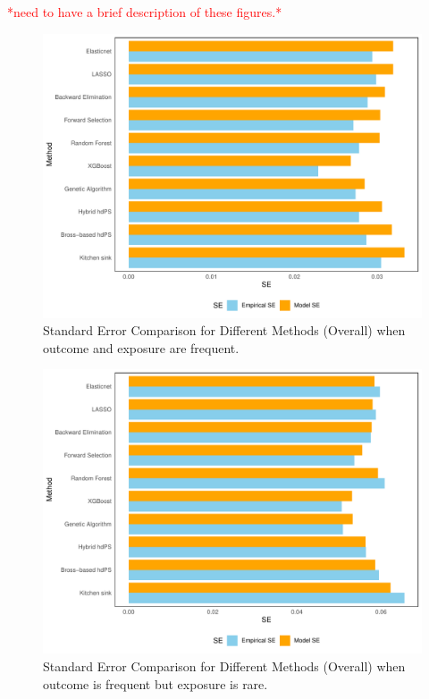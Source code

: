 \documentclass[
  10pt,
]{article}
\begin{document}
\textcolor{red}{*need to have a brief description of these figures.*}

\begin{figure}

{\centering \includegraphics[width=1\linewidth]{se_comparison_plot} 

}

\caption{Standard Error Comparison for Different Methods (Overall) when outcome and exposure are frequent.}\label{fig:unnamed-chunk-1}
\end{figure}

\begin{figure}

{\centering \includegraphics[width=1\linewidth]{se_comparison_plotER} 

}

\caption{Standard Error Comparison for Different Methods (Overall) when outcome is frequent but exposure is rare.}\label{fig:unnamed-chunk-2}
\end{figure}
\end{document}
